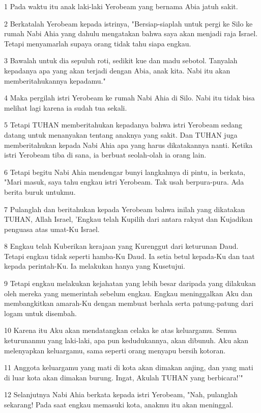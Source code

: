 \par 1 Pada waktu itu anak laki-laki Yerobeam yang bernama Abia jatuh sakit.
\par 2 Berkatalah Yerobeam kepada istrinya, "Bersiap-siaplah untuk pergi ke Silo ke rumah Nabi Ahia yang dahulu mengatakan bahwa saya akan menjadi raja Israel. Tetapi menyamarlah supaya orang tidak tahu siapa engkau.
\par 3 Bawalah untuk dia sepuluh roti, sedikit kue dan madu sebotol. Tanyalah kepadanya apa yang akan terjadi dengan Abia, anak kita. Nabi itu akan memberitahukannya kepadamu."
\par 4 Maka pergilah istri Yerobeam ke rumah Nabi Ahia di Silo. Nabi itu tidak bisa melihat lagi karena ia sudah tua sekali.
\par 5 Tetapi TUHAN memberitahukan kepadanya bahwa istri Yerobeam sedang datang untuk menanyakan tentang anaknya yang sakit. Dan TUHAN juga memberitahukan kepada Nabi Ahia apa yang harus dikatakannya nanti. Ketika istri Yerobeam tiba di sana, ia berbuat seolah-olah ia orang lain.
\par 6 Tetapi begitu Nabi Ahia mendengar bunyi langkahnya di pintu, ia berkata, "Mari masuk, saya tahu engkau istri Yerobeam. Tak usah berpura-pura. Ada berita buruk untukmu.
\par 7 Pulanglah dan beritahukan kepada Yerobeam bahwa inilah yang dikatakan TUHAN, Allah Israel, 'Engkau telah Kupilih dari antara rakyat dan Kujadikan penguasa atas umat-Ku Israel.
\par 8 Engkau telah Kuberikan kerajaan yang Kurenggut dari keturunan Daud. Tetapi engkau tidak seperti hamba-Ku Daud. Ia setia betul kepada-Ku dan taat kepada perintah-Ku. Ia melakukan hanya yang Kusetujui.
\par 9 Tetapi engkau melakukan kejahatan yang lebih besar daripada yang dilakukan oleh mereka yang memerintah sebelum engkau. Engkau meninggalkan Aku dan membangkitkan amarah-Ku dengan membuat berhala serta patung-patung dari logam untuk disembah.
\par 10 Karena itu Aku akan mendatangkan celaka ke atas keluargamu. Semua keturunanmu yang laki-laki, apa pun kedudukannya, akan dibunuh. Aku akan melenyapkan keluargamu, sama seperti orang menyapu bersih kotoran.
\par 11 Anggota keluargamu yang mati di kota akan dimakan anjing, dan yang mati di luar kota akan dimakan burung. Ingat, Akulah TUHAN yang berbicara!'"
\par 12 Selanjutnya Nabi Ahia berkata kepada istri Yerobeam, "Nah, pulanglah sekarang! Pada saat engkau memasuki kota, anakmu itu akan meninggal.
